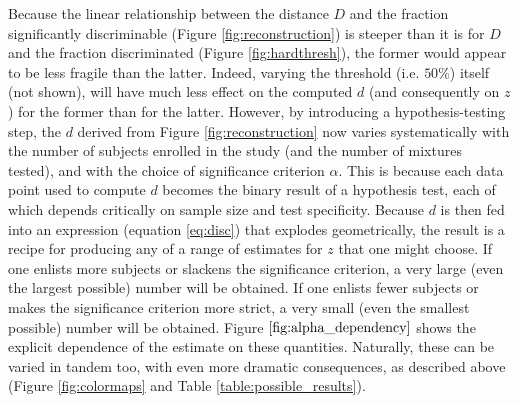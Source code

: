 \documentclass[letterpaper,twocolumn,10pt]{article}
\begin{document}
Because the linear relationship between the distance $D$ and the fraction significantly discriminable (Figure \ref{fig:reconstruction}) is steeper than it is for $D$ and the fraction discriminated (Figure \ref{fig:hardthresh}), 
the former would appear to be less fragile than the latter.  
Indeed, varying the threshold (i.e. $50\%$) itself (not shown), 
will have much less effect on the computed $d$ (and consequently on $z$) for the former than for the latter.  
However, by introducing a hypothesis-testing step, the $d$ derived from Figure \ref{fig:reconstruction} now varies systematically with the number of subjects enrolled in the study (and the number of mixtures tested), 
and with the choice of significance criterion $\alpha$.  
This is because each data point used to compute $d$ becomes the binary result of a hypothesis test, 
each of which depends critically on sample size and test specificity.  
Because $d$ is then fed into an expression (equation \ref{eq:disc}) that explodes geometrically, 
the result is a recipe for producing any of a range of estimates for $z$ that one might choose. 
If one enlists more subjects or slackens the significance criterion, 
a very large (even the largest possible) number will be obtained. 
If one enlists fewer subjects or makes the significance criterion more strict, 
a very small (even the smallest possible) number will be obtained. 
Figure $\ref{fig:alpha_dependency}$ shows the explicit dependence of the estimate on these quantities. 
Naturally, these can be varied in tandem too, with even more dramatic consequences, 
as described above (Figure \ref{fig:colormaps} and Table \ref{table:possible_results}). 
\end{document}
